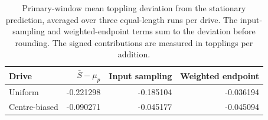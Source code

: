 \begin{table}[htbp]
\centering
\small
\caption{Primary-window mean toppling deviation from the stationary prediction, averaged over three equal-length runs per drive. The input-sampling and weighted-endpoint terms sum to the deviation before rounding. The signed contributions are measured in topplings per addition.}
\label{tab:meanerror}
\begin{tabular}{@{}lrrr@{}}
\toprule
Drive & $\bar S-\mu_p$ & Input sampling & Weighted endpoint\\
\midrule
Uniform & -0.221298 & -0.185104 & -0.036194\\
Centre-biased & -0.090271 & -0.045177 & -0.045094\\
\bottomrule
\end{tabular}
\end{table}
